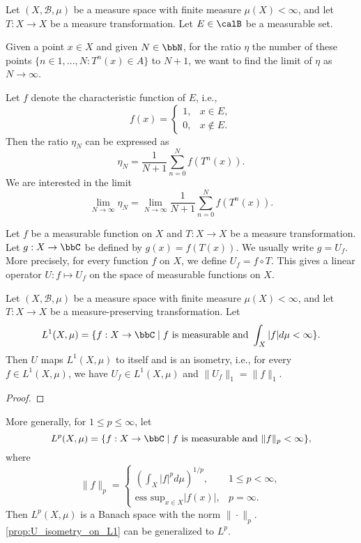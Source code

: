     Let \((X, \mathcal{B}, \mu)\) be a measure space with finite measure \(\mu(X) < \infty\), and let \(T: X \to X\) be a measure transformation.
    Let \(E \in \calB\) be a measurable set.

    Given a point \(x \in X\) and given \(N \in \bbN\), for the ratio \(\eta\) the number of these points \(\{n \in 1,...,N: T^n(x) \in A\}\) to \(N+1\), we want to find the limit of \(\eta\) as \(N \to \infty\).

    Let \(f\) denote the characteristic function of \(E\), i.e.,
    \[
        f(x) = \begin{cases}
            1, & x \in E, \\
            0, & x \notin E.
        \end{cases}
    \]
    Then the ratio \(\eta_N\) can be expressed as
    \[
        \eta_N = \frac{1}{N+1} \sum_{n=0}^{N} f(T^n(x)).
    \]
    We are interested in the limit
    \[   \lim_{N \to \infty} \eta_N = \lim_{N \to \infty} \frac{1}{N+1} \sum_{n=0}^{N} f(T^n(x)). \]


    Let \(f\) be a measurable function on \(X\) and \(T: X \to X\) be a measure transformation.
    Let \(g:X \to \bbC\) be defined by \(g(x) = f(T(x))\).
    We usually write \(g = U_f\).
    More precisely, for every function \(f\) on \(X\), we define \(U_f = f \circ T\).
    This gives a linear operator \(U: f \mapsto U_f\) on the space of measurable functions on \(X\).

    \begin{proposition}\label{prop:U_isometry_on_L1}
        Let \((X, \mathcal{B}, \mu)\) be a measure space with finite measure \(\mu(X) < \infty\), and let \(T: X \to X\) be a measure-preserving transformation.
        Let \
        \[ L^1(X, \mu) = \{ f: X \to \bbC \mid f \text{ is measurable and } \int_X |f| d\mu < \infty \}. \]
        Then \(U\) maps \(L^1(X, \mu)\) to itself and is an isometry, 
        i.e., for every \(f \in L^1(X, \mu)\), we have \(U_f \in L^1(X, \mu)\) and \(\|U_f\|_1 = \|f\|_1\).
    \end{proposition}
    \begin{proof}
    \end{proof}
    
    More generally, for \(1 \leq p \leq \infty\), let
    \[ L^p(X, \mu) = \{ f: X \to \bbC \mid f \text{ is measurable and } \|f\|_p < \infty \}, \]
    where
    \[
        \|f\|_p = \begin{cases}
            \left( \int_X |f|^p d\mu \right)^{1/p}, & 1 \leq p < \infty, \\
            \text{ess sup}_{x \in X} |f(x)|, & p = \infty.
        \end{cases}
    \]
    Then \(L^p(X, \mu)\) is a Banach space with the norm \(\|\cdot\|_p\).
    \cref{prop:U_isometry_on_L1} can be generalized to \(L^p\).

